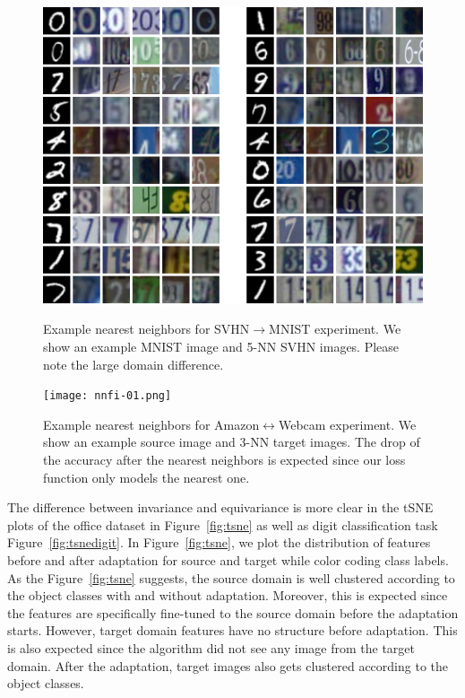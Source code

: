 \begin{figure}[ht]
\begin{small}
\includegraphics[width=\columnwidth]{digit_nn.png}
\vspace{-5mm}
\caption{Example nearest neighbors for SVHN$\rightarrow$MNIST experiment. We show an example MNIST image and 5-NN SVHN images. Please note the large domain difference.}
\label{fig:nn}
\texttt{[image: nnfi-01.png]}
\caption{Example nearest neighbors for Amazon$\leftrightarrow$Webcam experiment. We show an example source image and 3-NN target images. The drop of the accuracy after the nearest neighbors is expected since our loss function only models the nearest one.}
\label{fig:nnoffice}
\end{small}
\end{figure}

The difference between invariance and equivariance is more clear in the tSNE plots of the office dataset in Figure~\ref{fig:tsne} as well as digit classification task Figure~\ref{fig:tsnedigit}. In Figure~\ref{fig:tsne}, we plot the distribution of features before and after adaptation for source and target while color coding class labels. As the Figure~\ref{fig:tsne} suggests, the source domain is well clustered according to the object classes with and without adaptation. Moreover, this is expected since the features are specifically fine-tuned to the source domain before the adaptation starts. However, target domain features have no structure before adaptation. This is also expected since the algorithm did not see any image from the target domain. After the adaptation, target images also gets clustered according to the object classes. 

